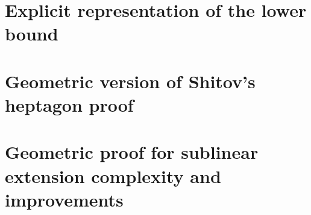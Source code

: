 \section{Explicit representation of the lower bound}

\section{Geometric version of Shitov's heptagon proof}

\section{Geometric proof for sublinear extension complexity and improvements}

\cite{shitov2020sublinear}
\cite{kwan2020extension}
